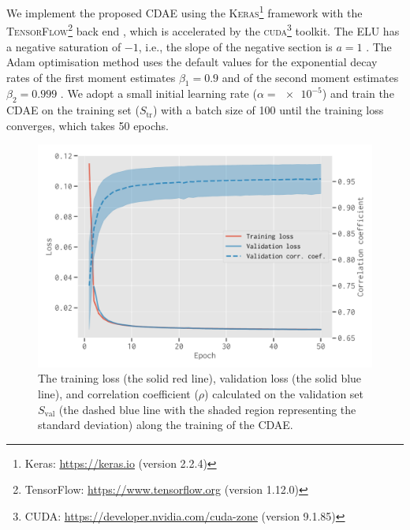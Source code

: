 \documentclass[fleqn,usenatbib]{mnras}
\newlength{\myfigwidth}
\newcommand{\R}[1]{\mathrm{#1}}
\newcommand{\editwip}[1]{{\leavevmode\color{magenta}#1}}
\begin{document}
We implement the proposed CDAE using the
\textsc{Keras}\footnote{Keras: \url{https://keras.io}
  (\editwip{version 2.2.4})}
framework \citep{keras} with the
\textsc{TensorFlow}\footnote{TensorFlow:
  \url{https://www.tensorflow.org} (\editwip{version 1.12.0})}
back end \citep{tensorflow},
\editwip{%
which is accelerated by the \textsc{cuda}\footnote{\raggedright%
  CUDA: \url{https://developer.nvidia.com/cuda-zone} (version 9.1.85)}
toolkit.
The ELU has a negative saturation of $-1$, i.e., the slope of the negative
section is $a = 1$ \citep{clevert2016}.
The Adam optimisation method uses the default values for the exponential
decay rates of the first moment estimates $\beta_1 = 0.9$ and of the
second moment estimates $\beta_2 = 0.999$ \citep{kingma2015}.
We adopt a small initial learning rate ($\alpha = \num{e-5}$) and train the
CDAE on the training set ($S_{\R{tr}}$) with a batch size of 100 until the
training loss converges, which takes 50 epochs.
} %

\begin{figure}
  \centering
  \includegraphics[width=\myfigwidth]{cdae-train}
  \caption{\label{fig:train}%
    The training loss (the solid red line), validation loss (the solid blue
    line), and correlation coefficient ($\rho$) calculated on the
    validation set $S_{\R{val}}$ (the \editwip{dashed blue} line with the
    shaded region representing the standard deviation) along the training
    of the CDAE.
  }
\end{figure}
\end{document}

